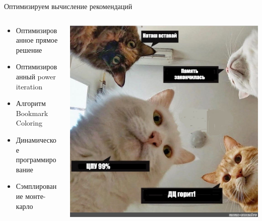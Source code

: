 \documentclass[11pt,aspectratio=169,handout]{beamer}
\begin{document}
\begin{frame}{Оптимизируем вычисление рекомендаций}

\begin{columns}

\begin{column}{0.5\textwidth}
\begin{itemize}[<+->]
\item Оптимизированное прямое решение
\item Оптимизированный power iteration
\item Алгоритм Bookmark Coloring 
\item Динамическое программирование
\item Сэмплирование монте-карло
\end{itemize}
\end{column}

\begin{column}{0.4\textwidth}
\begin{center}
\includegraphics[scale=0.2]{images/natash.jpeg}
\end{center}
\end{column}

\end{columns}

\end{frame}
\end{document}
